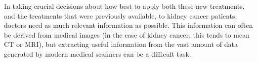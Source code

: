 In taking crucial decisions about how best to apply both these new treatments, and the treatments that were previously available, to kidney cancer patients, doctors need as much relevant information as possible. This information can often be derived from medical images (in the case of kidney cancer, this tends to mean CT or MRI), but extracting useful information from the vast amount of data generated by modern medical scanners can be a difficult task.